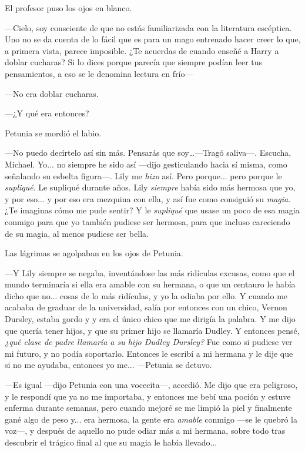 El profesor puso los ojos en blanco.

—Cielo, soy consciente de que no estás familiarizada con la literatura escéptica. Uno no se da cuenta de lo fácil que es para un mago entrenado hacer creer lo que, a primera vista, parece imposible. ¿Te acuerdas de cuando enseñé a Harry a doblar cucharas? Si lo dices porque parecía que siempre podían leer tus pensamientos, a eso se le denomina lectura en frío—

—No era doblar cucharas.

—¿Y qué era entonces?

Petunia se mordió el labio.

—No puedo decírtelo así sin más. Pensarás que soy\dots —Tragó saliva—. Escucha, Michael. Yo... no siempre he sido así —dijo gesticulando hacia sí misma, como señalando su esbelta figura—. Lily me \emph{hizo} así. Pero porque... pero porque le \emph{supliqué}. Le supliqué durante años. Lily \emph{siempre} había sido más hermosa que yo, y por eso... y por eso era mezquina con ella, y así fue como consiguió su \emph{magia}. ¿Te imaginas cómo me pude sentir? Y le \emph{supliqué} que usase un poco de esa magia conmigo para que yo también pudiese ser hermosa, para que incluso careciendo de su magia, al menos pudiese ser bella.

Las lágrimas se agolpaban en los ojos de Petunia.

—Y Lily siempre se negaba, inventándose las más ridículas excusas, como que el mundo terminaría si ella era amable con su hermana, o que un centauro le había dicho que no... cosas de lo más ridículas, y yo la odiaba por ello. Y cuando me acababa de graduar de la universidad, salía por entonces con un chico, Vernon Dursley, estaba gordo y y era el único chico que me dirigía la palabra. Y me dijo que quería tener hijos, y que su primer hijo se llamaría Dudley. Y entonces pensé, \emph{¿qué clase de padre llamaría a su hijo Dudley Dursley?} Fue como si pudiese ver mi futuro, y no podía soportarlo. Entonces le escribí a mi hermana y le dije que si no me ayudaba, entonces yo me... —Petunia se detuvo.

—Es igual —dijo Petunia con una vocecita—, accedió. Me dijo que era peligroso, y le respondí que ya no me importaba, y entonces me bebí una poción y estuve enferma durante semanas, pero cuando mejoré se me limpió la piel y finalmente gané algo de peso y... era hermosa, la gente era \emph{amable} conmigo —se le quebró la voz—, y después de aquello no pude odiar más a mi hermana, sobre todo tras descubrir el trágico final al que su magia le había llevado...

